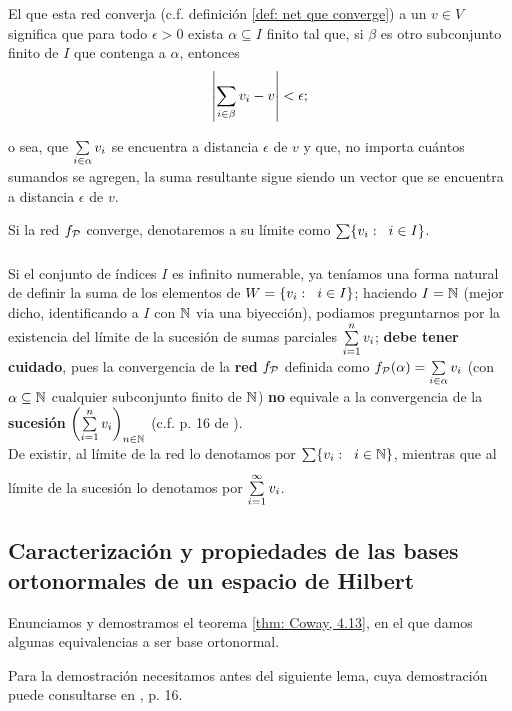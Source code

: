 El que esta red converja (c.f. definición
\ref{def: net que converge}) a un $v \in V$ significa que
para todo $\epsilon >0$ exista $\alpha \subseteq I$
finito tal que, si $\beta$ es otro subconjunto finito de $I$
que contenga a $\alpha$, entonces
\[
\left| \sum\limits_{i \in \beta}^{}v_{i} - v \right| < \epsilon;
\]

\noindent o sea, que $\sum\limits_{i \in \alpha}^{}v_{i}$
se encuentra a distancia $\epsilon$ de $v$ y que, no importa
cuántos sumandos se agregen, la suma resultante sigue siendo 
un vector que se encuentra a 
distancia $\epsilon$ de $v$.

\begin{notacion}
Si la red $f_{\mathcal{P}}$ converge,
denotaremos a su límite como
$\sum\limits_{}^{}\{ v_{i}: \hspace{0.2cm} i \in I \}$.
\end{notacion}

\begin{nota}
Si el conjunto de índices $I$ es infinito numerable, ya 
teníamos una forma natural de definir la suma 
de los elementos de $W = \{ v_{i}: \hspace{0.2cm} i \in I \}$;
haciendo $I = \mathbb{N}$ (mejor dicho, identificando a $I$ con 
$\mathbb{N}$ via una biyección), podiamos preguntarnos por la existencia
del límite de la sucesión de sumas parciales
$\sum\limits_{i=1}^{n}v_{i}$; \textbf{debe tener cuidado}, pues
la convergencia de la \textbf{red} $f_{\mathcal{P}}$ definida como 
$f_{\mathcal{P}}(\alpha) = \sum\limits_{i \in \alpha}^{}v_{i}$ 
(con $\alpha \subseteq \mathbb{N}$ cualquier subconjunto finito de $\mathbb{N}$)
\textbf{no}
equivale a la convergencia de la \textbf{sucesión}
$\left( \sum\limits_{i=1}^{n}v_{i} \right)_{n \in \mathbb{N}}$
(c.f. p. 16 de \cite{conway}). \\
De existir, al límite de la red lo denotamos por
$\sum\limits_{}^{}\{ v_{i} : \hspace{0.2cm} i \in \mathbb{N} \}$, mientras
que al límite de la sucesión lo denotamos por
$\sum\limits_{i=1}^{\infty}v_{i}$.
\end{nota} 


\subsection{Caracterización y propiedades de las bases ortonormales de un espacio de Hilbert}


Enunciamos y demostramos el teorema
\ref{thm: Coway, 4.13}, en el que damos algunas equivalencias
a ser base ortonormal.

Para la demostración necesitamos antes del siguiente lema,
cuya demostración puede consultarse en \cite{conway}, p. 16.

